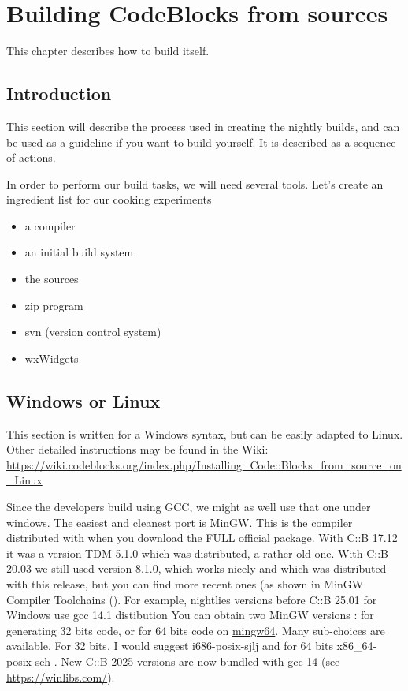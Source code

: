 \chapter{Building CodeBlocks from sources}\label{sec:build_codeblocks}

This chapter describes how to build \codeblocks itself.


\section{Introduction}

This section will describe the process used in creating the nightly builds, and can be used as a guideline if you want to build \codeblocks yourself. It is described as a sequence of actions.

In order to perform our build tasks, we will need several tools. Let's create an ingredient list for our cooking experiments

\begin{itemize}[noitemsep]
\item a compiler
\item an initial build system
\item the \codeblocks sources
\item zip program
\item svn (version control system)
\item wxWidgets
\end{itemize}

\section{Windows or Linux}

This section is written for a Windows syntax, but can be easily adapted to Linux. 
Other detailed instructions may be found in the Wiki: \url{ https://wiki.codeblocks.org/index.php/Installing_Code::Blocks_from_source_on_Linux}

Since the \codeblocks developers build \codeblocks using GCC, we might as well use that one under windows. The easiest and cleanest port is MinGW. This is the compiler distributed with \codeblocks when you download the FULL official package. With C::B 17.12 it was a version TDM 5.1.0 which was distributed, a rather old one. With C::B 20.03 we still used version 8.1.0, which works nicely and which was distributed with this \codeblocks release, but you can find more recent ones (as shown in MinGW Compiler Toolchains (). For example, nightlies versions before C::B 25.01 for Windows use gcc 14.1 distibution You can obtain two MinGW versions : for generating 32 bits code, or for 64 bits code on \href{https://sourceforge.net/projects/mingw-w64/files/}{mingw64}. Many sub-choices are available. For 32 bits, I would suggest i686-posix-sjlj and for 64 bits x86\_64-posix-seh \cite{url:mingw64}. New C::B 2025 versions are now bundled with gcc 14 (see \url{https://winlibs.com/}).

